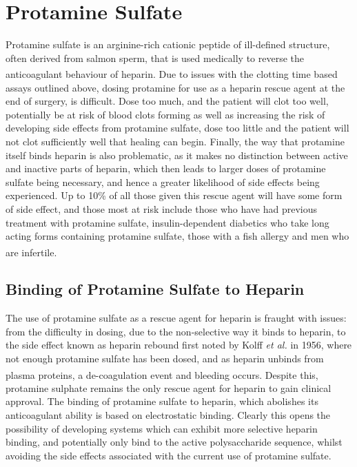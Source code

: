 \section{Protamine Sulfate}
Protamine sulfate is an arginine-rich cationic peptide of ill-defined structure, often derived from salmon sperm, that is used medically to reverse the anticoagulant behaviour of heparin.\textsuperscript{\cite{Bromfield2013HeparinApplications,Balhorn2007TheProteins}}
Due to issues with the clotting time based assays outlined above, dosing protamine for use as a heparin rescue agent at the end of surgery, is difficult. Dose too much, and the patient will clot too well, potentially be at risk of blood clots forming as well as increasing the risk of developing side effects from protamine sulfate, dose too little and the patient will not clot sufficiently well that healing can begin.
\newline
Finally, the way that protamine itself binds heparin is also problematic, as it makes no distinction between active and inactive parts of heparin, which then leads to larger doses of protamine sulfate being necessary, and hence a greater likelihood of side effects being experienced. Up to 10\% of all those given this rescue agent will have some form of side effect, and those most at risk include those who have had previous treatment with protamine sulfate, insulin-dependent diabetics who take long acting forms containing protamine sulfate, those with a fish allergy and men who are infertile.\textsuperscript{\cite{Bromfield2013HeparinApplications,BritishMedicalAssociation.2017BNF2017.}} 

\subsection{Binding of Protamine Sulfate to Heparin}
The use of protamine sulfate as a rescue agent for heparin is fraught with issues: from the difficulty in dosing, due to the non-selective way it binds to heparin, to the side effect known as heparin rebound first noted by Kolff \textit{et al.} in 1956, where not enough protamine sulfate has been dosed, and as heparin unbinds from plasma proteins, a de-coagulation event and bleeding occurs.\textsuperscript{\cite{Kolff1956DisposableMedicine}} Despite this, protamine sulphate remains the only rescue agent for heparin to gain clinical approval. 
\newline
The binding of protamine sulfate to heparin, which abolishes its anticoagulant ability is based on electrostatic binding. Clearly this opens the possibility of developing systems which can exhibit more selective heparin binding, and potentially only bind to the active polysaccharide sequence, whilst avoiding the side effects associated with the current use of protamine sulfate. 

